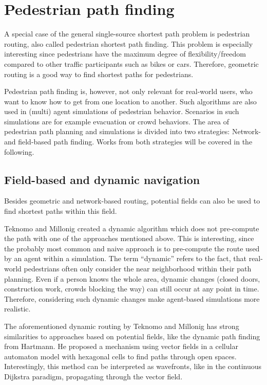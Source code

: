 \section{Pedestrian path finding}
\label{sec:pedestrian-path-planning}
	
	A special case of the general single-source shortest path problem is pedestrian routing, also called pedestrian shortest path finding.
	This problem is especially interesting since pedestrians have the maximum degree of flexibility/freedom compared to other traffic participants such as bikes or cars.
	Therefore, geometric routing is a good way to find shortest paths for pedestrians.
	
	Pedestrian path finding is, however, not only relevant for real-world users, who want to know how to get from one location to another.
	Such algorithms are also used in (multi) agent simulations of pedestrian behavior.
	Scenarios in such simulations are for example evacuation or crowd behaviors.
	The area of pedestrian path planning and simulations is divided into two strategies: Network- and field-based path finding\cite{hartmann-geodesic}.
	Works from both strategies will be covered in the following.
	
	\subsection{Field-based and dynamic navigation}
	\label{subsec:field-based-routing}
	
		Besides geometric and network-based routing, potential fields can also be used to find shortest paths within this field.
		
		Teknomo and Millonig created a dynamic algorithm which does not pre-compute the path with one of the approaches mentioned above\cite{teknomo-millonig-routing}.
		This is interesting, since the probably most common and naive approach is to pre-compute the route used by an agent within a simulation.
		The term \enquote{dynamic} refers to the fact, that real-world pedestrians often only consider the near neighborhood within their path planning.
		Even if a person knows the whole area, dynamic changes (closed doors, construction work, crowds blocking the way) can still occur at any point in time.
		Therefore, considering such dynamic changes make agent-based simulations more realistic.
		
		The aforementioned dynamic routing by Teknomo and Millonig has strong similarities to approaches based on potential fields, like the dynamic path finding from Hartmann\cite{hartmann-geodesic}.
		He proposed a mechanism using vector fields in a cellular automaton model with hexagonal cells to find paths through open spaces.
		Interestingly, this method can be interpreted as wavefronts, like in the continuous Dijkstra paradigm, propagating through the vector field.
			
